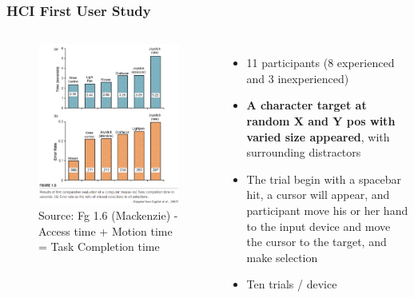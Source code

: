 \documentclass{beamer}
\begin{document}
\begin{frame}
\frametitle{HCI First User Study}

\begin{columns}[c] %
	
	\begin{figure}
		\includegraphics[width=1\linewidth]{results}
		\caption{Source: Fg 1.6 (Mackenzie) - Access time + Motion time = Task Completion time}
	\end{figure}
	
	\begin{itemize}
		\item 11 participants (8 experienced and 3 inexperienced)
		\item \textbf{A character target at random X and Y pos with varied size appeared}, with surrounding distractors
		\item The trial begin with a spacebar hit, a cursor will appear, and participant move his or her hand to the input device and move the cursor to the target, and make selection
		\item Ten trials / device
	\end{itemize}
	
\end{columns}

\end{frame}
\end{document}
